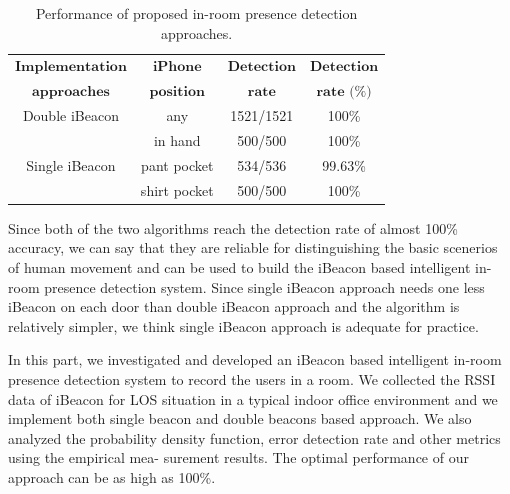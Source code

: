 \documentclass[12pt]{report}
\begin{document}
\begin{table}[!htp]
\begin{center}
\caption{Performance of proposed in-room presence detection approaches.} 
\begin{tabular}[b]{ c || c c c}
	\hline
	\hline
	$\textbf{Implementation}$	& $\textbf{iPhone}$   & $\textbf{Detection}$ & $\textbf{Detection}$\\
	$\textbf{approaches}$ & $\textbf{position}$ & $\textbf{rate}$      & $\textbf{rate (\%)}$\\
  \hline
	Double iBeacon 	& any						& 1521/1521 & 100\% \\
	\hline								
									& in hand 			& 500/500		& 100\% \\
	Single iBeacon	& pant pocket 	& 534/536		& 99.63\% \\
									& shirt pocket	& 500/500		& 100\% \\
	\hline
	\hline
\end{tabular}
\end{center}
\vspace{-6mm}
\end{table}

Since both of the two algorithms reach the detection rate of almost 100\% accuracy, we can say that they are reliable for distinguishing the basic scenerios of human movement and can be used to build the iBeacon based intelligent in-room
presence detection system. Since single iBeacon approach needs one less iBeacon on each door than double iBeacon approach and the algorithm is relatively simpler, we think single iBeacon approach is adequate for practice.

In this part, we investigated and developed an iBeacon based intelligent in-room presence detection system to record the users in a room. We collected the RSSI data of iBeacon for LOS situation in a typical indoor office environment and we implement both single beacon and double beacons based approach. We also analyzed the probability density function, error detection rate and other metrics using the empirical mea- surement results. The optimal performance of our approach can be as high as 100\%.

\end{document}
